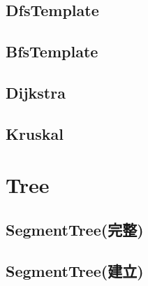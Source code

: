 \subsection{DfsTemplate}


\subsection{BfsTemplate}


\subsection{Dijkstra}


\subsection{Kruskal}

\section{Tree}

\subsection{SegmentTree(完整)}


\subsection{SegmentTree(建立)}

